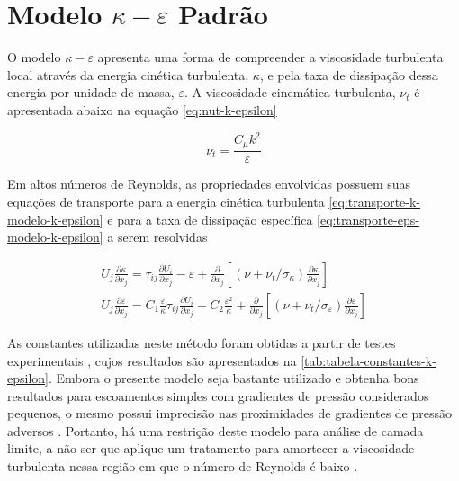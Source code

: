 \section{Modelo \texorpdfstring{\(\kappa-\varepsilon\)}{k-e} Padrão}

O modelo \(\kappa-\varepsilon\) \cite{JONES1972301,LAUNDER1974269,launder1974} apresenta uma forma de compreender a viscosidade turbulenta local através da energia cinética turbulenta, \(\kappa\), e pela taxa de dissipação dessa energia por unidade de massa, \(\varepsilon\). A viscosidade cinemática turbulenta, \(\nu_{t}\) é apresentada abaixo na equação \ref{eq:nut-k-epsilon}

\begin{equation}
    \nu_t = \frac{C_\mu k^2}{\varepsilon}
    \label{eq:nut-k-epsilon}
\end{equation}

Em altos números de Reynolds, as propriedades envolvidas possuem suas equações de transporte para a energia cinética turbulenta \ref{eq:transporte-k-modelo-k-epsilon} e para a taxa de dissipação específica \ref{eq:transporte-eps-modelo-k-epsilon} a serem resolvidas \cite{Wilcox2006}

\begin{gather}
    U_{j} \frac{\partial \kappa}{\partial x_j} = \tau_{ij}\frac{\partial U_i}{\partial x_j} - \varepsilon + \frac{\partial}{\partial x_j}\left[\left(\nu + \nu_{t}/\sigma_{\kappa}\right)\frac{\partial \kappa}{\partial x_j}\right]
    \label{eq:transporte-k-modelo-k-epsilon}
    \\
   	U_{j} \frac{\partial \varepsilon}{\partial x_j} = C_{1}\frac{\varepsilon}{\kappa}\tau_{ij}\frac{\partial U_i}{\partial x_j} - C_{2}\frac{\varepsilon^{2}}{\kappa} + \frac{\partial}{\partial x_j}\left[\left(\nu + \nu_{t}/\sigma_{\varepsilon}\right)\frac{\partial \varepsilon}{\partial x_j}\right]
    \label{eq:transporte-eps-modelo-k-epsilon}
\end{gather}
	
As constantes utilizadas neste método foram obtidas a partir de testes experimentais \cite{JONES1972301}, cujos resultados são apresentados na \autoref{tab:tabela-constantes-k-epsilon}. Embora o presente modelo seja bastante utilizado e obtenha bons resultados para escoamentos simples com gradientes de pressão considerados pequenos, o mesmo possui imprecisão nas proximidades de gradientes de pressão adversos \cite{Wilcox1988ReassessmentOT}. Portanto, há uma restrição deste modelo para análise de camada limite, a não ser que aplique um tratamento para amortecer a viscosidade turbulenta nessa região em que o número de Reynolds é baixo \cite{Moukalled2015}.

